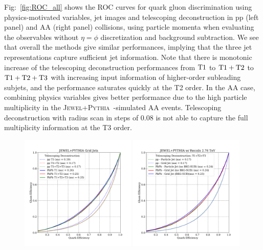 \documentclass[notoc]{JHEP3}
\newcommand{\jwpy}{\textsc{Jewel+Pythia}~}
\begin{document}
Fig:~\ref{fig:ROC_all} shows the ROC curves for quark gluon discrimination using physics-motivated variables, jet images and telescoping deconstruction in pp (left panel) and AA (right panel) collisions, using particle momenta when evaluating the observables without $\eta=\phi$ discretization and background subtraction. We see that overall the methods give similar performances, implying that the three jet representations capture sufficient jet information. Note that there is monotonic increase of the telescoping deconstruction performances from $\rm T1$ to $\rm T1+T2$ to $\rm T1+T2+T3$ with increasing input information of higher-order subleading subjets, and the performance saturates quickly at the T2 order. In the AA case, combining physics variables gives better performance due to the high particle multiplicity in the \jwpy-simulated AA events. Telescoping deconstruction with radius scan in steps of 0.08 is not able to capture the full multiplicity information at the T3 order.

\begin{figure}
	   \centering
       \includegraphics[width=0.49\textwidth]{plots/JEWELPYTHIA_TD_2p76TeV_ppvsPbPb.pdf}
       \includegraphics[width=0.49\textwidth]{plots/JEWELPYTHIA_TD123_2p76TeV_ppvsPbPb_comp_QvsG.pdf}
	   \caption{}
\label{fig:ROC_TD_input}
\end{figure}
\end{document}
